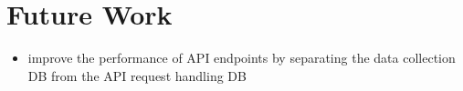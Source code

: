 \chapter{Future Work}

\begin{itemize}
  \item improve the performance of API endpoints by separating the data collection DB from the API request handling DB


\end{itemize}
